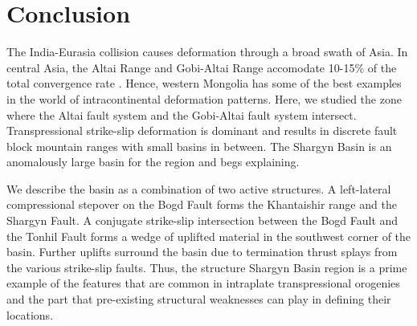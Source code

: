 \section{Conclusion}
	The India-Eurasia collision causes deformation through a broad swath of Asia. In central Asia, the Altai Range and Gobi-Altai Range accomodate 10-15\% of the total convergence rate \citep{Calais2003}. Hence, western Mongolia has some of the best examples in the world of intracontinental deformation patterns. Here, we studied the zone where the Altai fault system and the Gobi-Altai fault system intersect. Transpressional strike-slip deformation is dominant and results in discrete fault block mountain ranges with small basins in between. The Shargyn Basin is an anomalously large basin for the region and begs explaining. 

	We describe the basin as a combination of two active structures. A left-lateral compressional stepover on the Bogd Fault forms the Khantaishir range and the Shargyn Fault. A conjugate strike-slip intersection between the Bogd Fault and the Tonhil Fault forms a wedge of uplifted material in the southwest corner of the basin. Further uplifts surround the basin due to termination thrust splays from the various strike-slip faults. Thus, the structure Shargyn Basin region is a prime example of the features that are common in intraplate transpressional orogenies and the part that pre-existing structural weaknesses can play in defining their locations.
